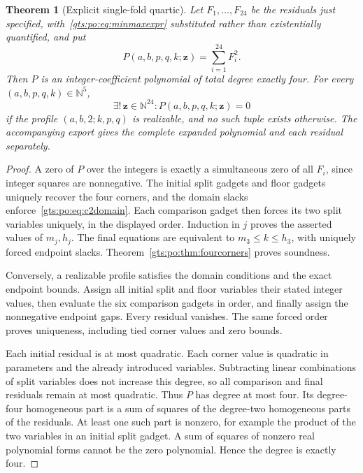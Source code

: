 \documentclass[11pt,letterpaper]{article}
\newtheorem{theorem}{Theorem}[section]
\theoremstyle{definition}
\theoremstyle{remark}
\newcommand{\N}{\mathbb N}
\begin{document}
\begin{theorem}[Explicit single-fold quartic]\label{gts:po:thm:canonical}
Let $F_1,\ldots,F_{24}$ be the residuals just specified, with~\eqref{gts:po:eq:minmaxexpr} substituted rather than existentially quantified, and put
\begin{equation}\label{gts:po:eq:quartic}
 P(a,b,p,q,k;\boldsymbol z)=\sum_{i=1}^{24}F_i^2.
\end{equation}
Then $P$ is an integer-coefficient polynomial of total degree exactly four. For every $(a,b,p,q,k)\in\N^5$,
\[
 \exists!\,\boldsymbol z\in\N^{24}:P(a,b,p,q,k;\boldsymbol z)=0
\]
if the profile $(a,b,2;k,p,q)$ is realizable, and no such tuple exists otherwise. The accompanying export gives the complete expanded polynomial and each residual separately.
\end{theorem}
\begin{proof}
A zero of $P$ over the integers is exactly a simultaneous zero of all $F_i$, since integer squares are nonnegative. The initial split gadgets and floor gadgets uniquely recover the four corners, and the domain slacks enforce~\eqref{gts:po:eq:c2domain}. Each comparison gadget then forces its two split variables uniquely, in the displayed order. Induction in $j$ proves the asserted values of $m_j,h_j$. The final equations are equivalent to $m_3\le k\le h_3$, with uniquely forced endpoint slacks. Theorem~\ref{gts:po:thm:fourcorners} proves soundness.

Conversely, a realizable profile satisfies the domain conditions and the exact endpoint bounds. Assign all initial split and floor variables their stated integer values, then evaluate the six comparison gadgets in order, and finally assign the nonnegative endpoint gaps. Every residual vanishes. The same forced order proves uniqueness, including tied corner values and zero bounds.

Each initial residual is at most quadratic. Each corner value is quadratic in parameters and the already introduced variables. Subtracting linear combinations of split variables does not increase this degree, so all comparison and final residuals remain at most quadratic. Thus $P$ has degree at most four. Its degree-four homogeneous part is a sum of squares of the degree-two homogeneous parts of the residuals. At least one such part is nonzero, for example the product of the two variables in an initial split gadget. A sum of squares of nonzero real polynomial forms cannot be the zero polynomial. Hence the degree is exactly four.
\end{proof}
\end{document}
